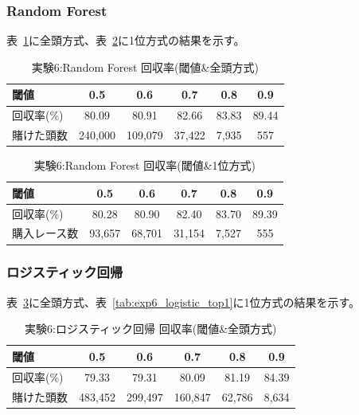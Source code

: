 \documentclass[dvipdfmx, a4paper, 11pt, titlepage]{jsarticle}
\begin{document}
\subsubsection*{Random Forest}

表~\ref{tab:exp6_rf_all}に全頭方式、表~\ref{tab:exp6_rf_top1}に1位方式の結果を示す。

\begin{table}[H]
  \centering
  \caption{実験6:Random Forest 回収率(閾値\&全頭方式)}
  \label{tab:exp6_rf_all}
  \begin{tabular}{lccccc}
    \toprule
    閾値 & 0.5 & 0.6 & 0.7 & 0.8 & 0.9 \\
    \midrule
    回収率(\%)   & 80.09 & 80.91 & 82.66 & 83.83 & 89.44 \\
    賭けた頭数   & 240{,}000 & 109{,}079 & 37{,}422 & 7{,}935 & 557 \\
    \bottomrule
  \end{tabular}
\end{table}

\begin{table}[H]
  \centering
  \caption{実験6:Random Forest 回収率(閾値\&1位方式)}
  \label{tab:exp6_rf_top1}
  \begin{tabular}{lccccc}
    \toprule
    閾値 & 0.5 & 0.6 & 0.7 & 0.8 & 0.9 \\
    \midrule
    回収率(\%)     & 80.28 & 80.90 & 82.40 & 83.70 & 89.39 \\
    購入レース数   & 93{,}657 & 68{,}701 & 31{,}154 & 7{,}527 & 555 \\
    \bottomrule
  \end{tabular}
\end{table}

\subsubsection*{ロジスティック回帰}

表~\ref{tab:exp6_logistic_all}に全頭方式、表~\ref{tab:exp6_logistic_top1}に1位方式の結果を示す。


\begin{table}[H]
  \centering
  \caption{実験6:ロジスティック回帰 回収率(閾値\&全頭方式)}
  \label{tab:exp6_logistic_all}
  \begin{tabular}{lccccc}
    \toprule
    閾値 & 0.5 & 0.6 & 0.7 & 0.8 & 0.9 \\
    \midrule
    回収率(\%)   & 79.33 & 79.31 & 80.09 & 81.19 & 84.39 \\
    賭けた頭数   & 483{,}452 & 299{,}497 & 160{,}847 & 62{,}786 & 8{,}634 \\
    \bottomrule
  \end{tabular}
\end{table}
\end{document}

